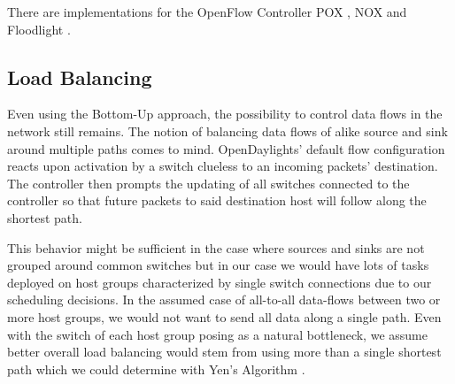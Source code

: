 There are implementations for the OpenFlow Controller POX \cite{opennetmon}, NOX \cite{opentm} and
Floodlight \cite{flowsense}.

\subsection{Load Balancing}
Even using the Bottom-Up approach, the possibility to control data flows in the network still remains.
The notion of balancing data flows of alike source and sink around multiple paths comes to mind.
OpenDaylights' default flow configuration reacts upon activation by a switch clueless to an incoming
packets' destination. The controller then prompts the updating of all switches connected to the controller
so that future packets to said destination host will follow along the shortest path.

This behavior might be sufficient in the case where sources and sinks are not grouped around common
switches but in our case we would have lots of tasks deployed on host groups characterized by single
switch connections due to our scheduling decisions. In the assumed case of all-to-all data-flows
between two or more host groups, we would not want to send all data along a single path. Even with
the switch of each host group posing as a natural bottleneck, we assume better overall load
balancing would stem from using more than a single shortest path which we could determine with Yen's
Algorithm \cite{yens}.
